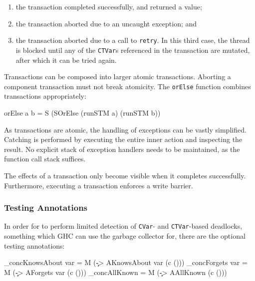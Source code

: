 \begin{enumerate}
\item the transaction completed successfully, and returned a value;

\item the transaction aborted due to an uncaught exception; and

\item the transaction aborted due to a call to \verb|retry|. In this
  third case, the thread is blocked until any of the \verb|CTVar|s
  referenced in the transaction are mutated, after which it can be
  tried again.
\end{enumerate}

Transactions can be composed into larger atomic transactions. Aborting
a component transaction must not break atomicity. The \verb|orElse|
function combines transactions appropriately:

\begin{haskellcode}
orElse a b = S (SOrElse (runSTM a) (runSTM b))
\end{haskellcode}


As transactions are atomic, the handling of exceptions can be vastly
simplified. Catching is performed by executing the entire inner action
and inspecting the result. No explicit stack of exception handlers
needs to be maintained, as the function call stack suffices.

The effects of a transaction only become visible when it completes
successfully. Furthermore, executing a transaction enforces a write
barrier.

\subsubsection{Testing Annotations}
\label{sec:execution-primops-annotations}

In order for \dejafu{} to perform limited detection of \verb|CVar|-
and \verb|CTVar|-based deadlocks, something which GHC can use the
garbage collector for, there are the optional testing annotations:

\begin{haskellcode}
_concKnowsAbout var = M (\c -> AKnowsAbout var (c ()))
_concForgets    var = M (\c -> AForgets    var (c ()))
_concAllKnown       = M (\c -> AAllKnown       (c ()))
\end{haskellcode}

